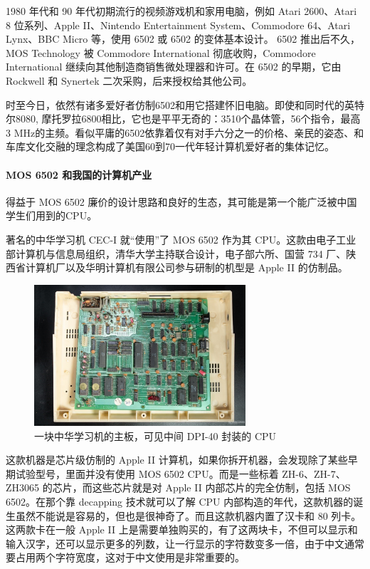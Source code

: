\documentclass[cn,black,12pt,normal]{elegantnote}
\begin{document}
1980 年代和 90 年代初期流行的视频游戏机和家用电脑，例如 Atari 2600、Atari 8 位系列、Apple II、Nintendo Entertainment System、Commodore 64、Atari Lynx、BBC Micro 等，使用 6502 或 6502 的变体基本设计。 6502 推出后不久，MOS Technology 被 Commodore International 彻底收购，Commodore International 继续向其他制造商销售微处理器和许可。在 6502 的早期，它由 Rockwell 和 Synertek 二次采购，后来授权给其他公司。

时至今日，依然有诸多爱好者仿制6502和用它搭建怀旧电脑。即使和同时代的英特尔8080, 摩托罗拉6800相比，它也是平平无奇的：3510个晶体管，56个指令，最高3 MHz的主频。看似平庸的6502依靠着仅有对手六分之一的价格、亲民的姿态、和车库文化交融的理念构成了美国60到70一代年轻计算机爱好者的集体记忆。

\paragraph{MOS 6502 和我国的计算机产业} 得益于 MOS 6502 廉价的设计思路和良好的生态，其可能是第一个能广泛被中国学生们用到的CPU。

著名的中华学习机 CEC-I 就“使用”了 MOS 6502 作为其 CPU。这款由电子工业部计算机与信息局组织，清华大学主持联合设计，电子部六所、国营 734 厂、陕西省计算机厂以及华明计算机有限公司参与研制的机型是 Apple II 的仿制品。

\begin{figure}[H]
  \centering
  \includegraphics[width=0.7\textwidth]{image/CIC1.jpeg}
  \caption{一块中华学习机的主板，可见中间 DPI-40 封装的 CPU}
\end{figure}

这款机器是芯片级仿制的 Apple II 计算机，如果你拆开机器，会发现除了某些早期试验型号，里面并没有使用 MOS 6502 CPU。而是一些标着 ZH-6、ZH-7、ZH3065 的芯片，而这些芯片就是对 Apple II 内部芯片的完全仿制，包括 MOS 6502。在那个靠 decapping 技术就可以了解 CPU 内部构造的年代，这款机器的诞生虽然不能说是容易的，但也是很神奇了。而且这款机器内置了汉卡和 80 列卡。这两款卡在一般 Apple II 上是需要单独购买的，有了这两块卡，不但可以显示和输入汉字，还可以显示更多的列数，让一行显示的字符数变多一倍，由于中文通常要占用两个字符宽度，这对于中文使用是非常重要的。
\end{document}
